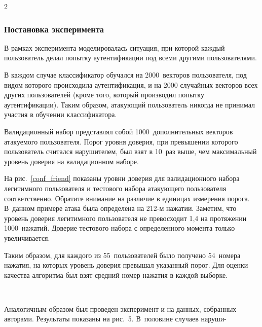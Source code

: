 \begin{multicols}{2}
\subsubsection{Постановка эксперимента}

В рамках эксперимента моделировалась ситуация, при которой каждый
пользователь делал попытку аутентификации под всеми другими
пользователями.

В каждом случае классификатор обучался на 2000~векторов
пользователя, под видом которого происходила аутентификация, и на
2000 случайных векторов всех других пользователей (кроме того,
который производил попытку аутентификации). Таким образом, атакующий
пользователь никогда не принимал участия в обучении классификатора.

Валидационный набор представлял собой 1000~дополнительных векторов
атакуемого пользователя. Порог уровня доверия, при превышении
которого пользователь считался нарушителем, был взят в 10~раз выше,
чем максимальный уровень доверия на валидационном наборе.

На рис.~\ref{conf_friend} показаны уровни доверия
для вали\-дационного набора легитимного пользователя и тес\-то\-во\-го
набора атакующего пользователя соответственно. Обратите внимание на
различие в еди\-ни\-цах измерения порога. В~данном примере атака была
определена на 212-м нажатии. Заметим, что уровень доверия
легитимного пользователя не превосходит 1,4 на протяжении 
1000~нажатий. Доверие тестового набора с определенного момента только
увеличивается.

Таким образом, для каждого из 55~пользователей было получено 
54~номера нажатия, на которых уровень доверия превышал указанный порог.
Для оценки качества алгоритма был взят средний номер нажатия в
каждой выборке.

\begin{figure*} %
\vspace*{9pt}
 \begin{center}
 \mbox{%
 \epsfxsize=161.908mm
 }
 \end{center}
 \vspace*{-6pt}
    \label{conf_friend}
    \vspace*{6pt}
\end{figure*}

Аналогичным образом был проведен эксперимент и на данных, собранных
авторами. Результаты показаны на рис.~5. В~половине случаев
наруши-\linebreak


\end{multicols}
